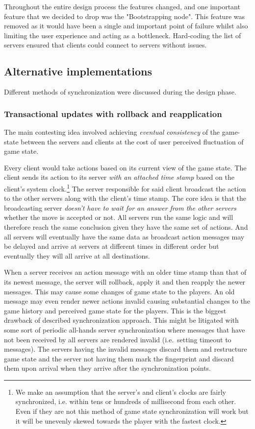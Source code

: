 \documentclass[a4paper]{article}
\begin{document}
Throughout the entire design process the features changed, and one important feature that we decided to drop was the "Bootstrapping node". This feature was removed as it would have been a single and important point of failure whilst also limiting the user experience and acting as a bottleneck. Hard-coding the list of servers ensured that clients could connect to servers without issues. 

\subsection{Alternative implementations} \label{alternative implementations}
Different methods of synchronization were discussed during the design phase. 

\subsubsection{Transactional updates with rollback and reapplication}
The main contesting idea involved achieving \emph{eventual consistency} of the game-state between the servers and clients at the cost of user perceived fluctuation of game state. 

Every client would take actions based on its current view of the game state. The client sends its action to its server \emph{with an attached time stamp} based on the client's system clock.\footnote{We make an assumption that the server's and client's clocks are fairly synchronized, i.e. within tens or hundreds of millisecond from each other. Even if they are not this method of game state synchronization will work but it will be unevenly skewed towards the player with the fastest clock.} The server responsible for said client broadcast the action to the other servers along with the client's time stamp. The core idea is that the broadcasting server \emph{doesn't have to wait for an answer from the other servers} whether the move is accepted or not. All servers run the same logic and will therefore reach the same conclusion given they have the same set of actions. And all servers will eventually have the same data as broadcast action messages may be delayed and arrive at servers at different times in different order but eventually they will all arrive at all destinations.

When a server receives an action message with an older time stamp than that of its newest message, the server will rollback, apply it and then reapply the newer messages. This may cause some changes of game state to the players. An old message may even render newer actions invalid causing substantial changes to the game history and perceived game state for the players. This is the biggest drawback of described synchronization approach. This might be litigated with some sort of periodic all-hands server synchronization where messages that have not been received by all servers are rendered invalid (i.e.\ setting timeout to messages). The servers having the invalid messages discard them and restructure game state and the server not having them mark the fingerprint and discard them upon arrival when they arrive after the synchronization points.
\end{document}
